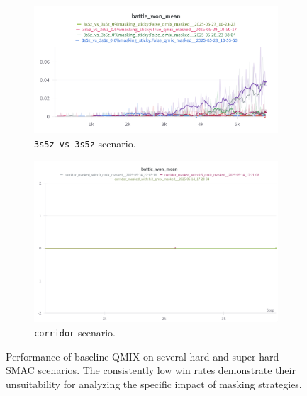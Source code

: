 \documentclass[../Main.tex]{subfiles}
\begin{document}
\begin{figure}[H]
    \begin{subfigure}[b]{0.48\textwidth}
        \centering
        \includegraphics[width=\linewidth]{img/results/3s5z_3s5z.png}
        \caption{\texttt{3s5z\_vs\_3s5z} scenario.}
        \label{fig:3s5z_vs_3s5z}
    \end{subfigure}
    \hfill
    \begin{subfigure}[b]{0.48\textwidth}
        \centering
        \includegraphics[width=0.95\linewidth]{img/results/corridor.png}
        \caption{\texttt{corridor} scenario.}
        \label{fig:corridor}
    \end{subfigure}


    \caption{Performance of baseline QMIX on several hard and super hard SMAC scenarios. The consistently low win rates demonstrate their unsuitability for analyzing the specific impact of masking strategies.}
    \label{fig:hard_scenarios_results}
\end{figure}
\end{document}
